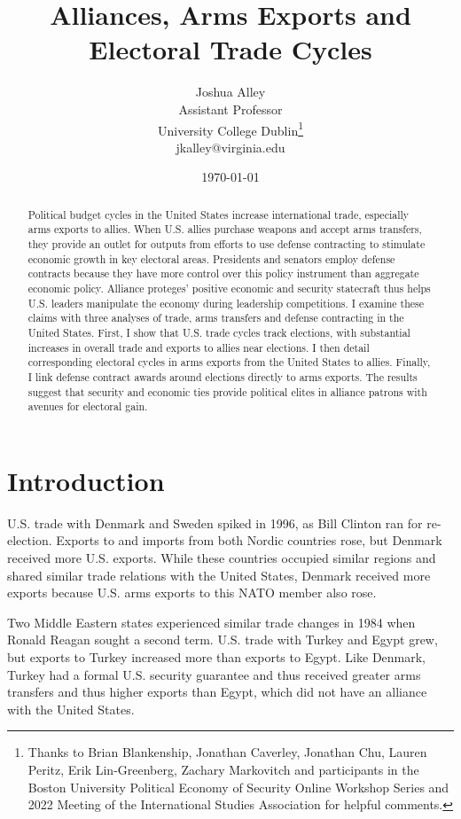 \documentclass[12pt]{article}
\title{\textbf{Alliances, Arms Exports and Electoral Trade Cycles}}
\author{Joshua Alley \\
Assistant Professor \\
University College Dublin\thanks{Thanks to Brian Blankenship, Jonathan Caverley, Jonathan Chu, Lauren Peritz, Erik Lin-Greenberg, Zachary Markovitch and participants in the Boston University Political Economy of Security Online Workshop Series and 2022 Meeting of the International Studies Association for helpful comments.} \\
jkalley@virginia.edu
}
\date{\today}
\begin{document}
\maketitle 

\begin{abstract} 
Political budget cycles in the United States increase international trade, especially arms exports to allies. 
When U.S. allies purchase weapons and accept arms transfers, they provide an outlet for outputs from efforts to use defense contracting to stimulate economic growth in key electoral areas.
Presidents and senators employ defense contracts because they have more control over this policy instrument than aggregate economic policy.
Alliance proteges' positive economic and security statecraft thus helps U.S. leaders manipulate the economy during leadership competitions.  
I examine these claims with three analyses of trade, arms transfers and defense contracting in the United States. 
First, I show that U.S. trade cycles track elections, with substantial increases in overall trade and exports to allies near elections.
I then detail corresponding electoral cycles in arms exports from the United States to allies. 
Finally, I link defense contract awards around elections directly to arms exports.
The results suggest that security and economic ties provide political elites in alliance patrons with avenues for electoral gain. 
\end{abstract} 


\newpage 
\doublespace 


\section{Introduction}


U.S. trade with Denmark and Sweden spiked in 1996, as Bill Clinton ran for re-election.
Exports to and imports from both Nordic countries rose, but Denmark received more U.S. exports.
While these countries occupied similar regions and shared similar trade relations with the United States, Denmark received more exports because U.S. arms exports to this NATO member also rose.


Two Middle Eastern states experienced similar trade changes in 1984 when Ronald Reagan sought a second term.
U.S. trade with Turkey and Egypt grew, but exports to Turkey increased more than exports to Egypt. 
Like Denmark, Turkey had a formal U.S. security guarantee and thus received greater arms transfers and thus higher exports than Egypt, which did not have an alliance with the United States. 
\end{document}

